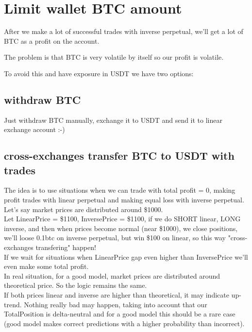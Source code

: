 \documentclass{article}
\begin{document}
\section{Limit wallet BTC amount}

After we make a lot of successful trades with inverse perpetual, we'll get a lot of BTC as a profit on the account.

The problem is that BTC is very volatile by itself so our profit is volatile.

To avoid this and have exposure in USDT we have two options:

\subsection{withdraw BTC}

Just withdraw BTC manually, exchange it to USDT and send it to linear exchange account :-)

\subsection{cross-exchanges transfer BTC to USDT with trades}

The idea is to use situations when we can trade with total profit = 0, making profit trades with linear perpetual and making equal loss with inverse perpetual. \\

Let's say market prices are distributed around \$1000. \\

Let LinearPrice = \$1100, InversePrice = \$1100, if we do SHORT linear, LONG inverse, and then when prices become normal (near \$1000), we close positions, we'll loose 0.1btc on inverse perpetual, but win \$100 on linear, so this way "cross-exchanges transfering" happen! \\

If we wait for situations when LinearPrice gap even higher than InversePrice we'll even make some total profit. \\

In real situation, for a good model, market prices are distributed around theoretical price. So the logic remains the same. \\

\warning If both prices linear and inverse are higher than theoretical, it may indicate up-trend. Nothing really bad may happen, taking into account that our TotalPosition is delta-neutral and for a good model this should be a rare case (good model makes correct predictions with a higher probability than incorrect). \\
\end{document}
